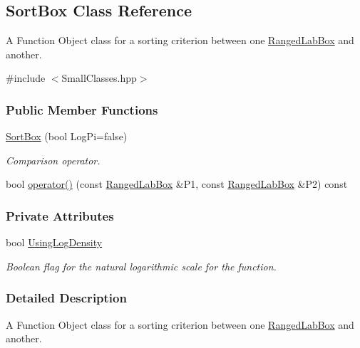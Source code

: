 \hypertarget{classSortBox}{\subsection{\-Sort\-Box \-Class \-Reference}
\label{classSortBox}
}


\-A \-Function \-Object class for a sorting criterion between one \hyperlink{classRangedLabBox}{\-Ranged\-Lab\-Box} and another.  




{\ttfamily \#include $<$\-Small\-Classes.\-hpp$>$}

\subsubsection*{\-Public \-Member \-Functions}
\begin{DoxyCompactItemize}
\item 
\hyperlink{classSortBox_ab3269a31ecf0c23162eb1ea11b007d31}{\-Sort\-Box} (bool \-Log\-Pi=false)
\begin{DoxyCompactList}\small\item\em \-Comparison operator. \end{DoxyCompactList}\item 
bool \hyperlink{classSortBox_ae1b1f1b6857d51efac4b49789ec442d4}{operator()} (const \hyperlink{classRangedLabBox}{\-Ranged\-Lab\-Box} \&\-P1, const \hyperlink{classRangedLabBox}{\-Ranged\-Lab\-Box} \&\-P2) const 
\end{DoxyCompactItemize}
\subsubsection*{\-Private \-Attributes}
\begin{DoxyCompactItemize}
\item 
bool \hyperlink{classSortBox_a3abbd28beba68a39e80544412e7adc46}{\-Using\-Log\-Density}
\begin{DoxyCompactList}\small\item\em \-Boolean flag for the natural logarithmic scale for the function. \end{DoxyCompactList}\end{DoxyCompactItemize}


\subsubsection{\-Detailed \-Description}
\-A \-Function \-Object class for a sorting criterion between one \hyperlink{classRangedLabBox}{\-Ranged\-Lab\-Box} and another. 

